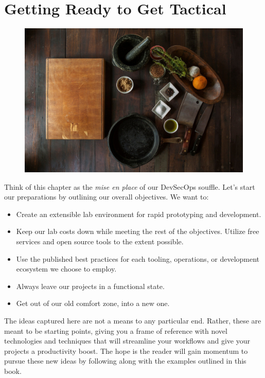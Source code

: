 \chapter{Getting Ready to Get Tactical}
\begin{figure}[!htb]
\centering
\includegraphics[scale=0.20]{../images/ingredients-498199_1920.jpg}
\end{figure}
\justify{}
Think of this chapter as the \emph{mise en place} of our DevSecOps souffle.
\pagebreak
\justify{}
Let's start our preparations by outlining our overall objectives. We want to:
\justify{}
\begin{itemize}
	\item
	      Create an extensible lab environment for rapid prototyping and
	      development.
	\item
	      Keep our lab costs down while meeting the rest of the objectives.
	      Utilize free services and open source tools to the extent possible.
	\item
	      Use the published best practices for each tooling, operations, or
	      development ecosystem we choose to employ.
	\item
	      Always leave our projects in a functional state.
	\item
	      Get out of our old comfort zone, into a new one.
\end{itemize}
\justify{}
The ideas captured here are not a means to any particular end. Rather,
these are meant to be starting points, giving you a frame of reference
with novel technologies and techniques that will streamline your
workflows and give your projects a productivity boost. The hope is the
reader will gain momentum to pursue these new ideas by following
along with the examples outlined in this book.
